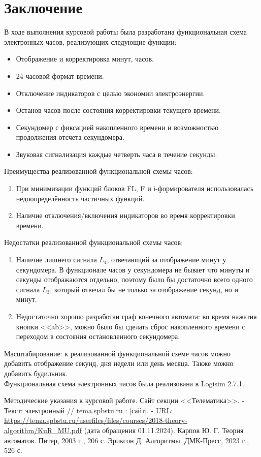 \documentclass[10pt,a4paper,final]{article} %
\begin{document}
\section*{Заключение}
В ходе выполнения курсовой работы была разработана функциональная схема электронных часов, реализующих следующие функции:
\begin{itemize}
	\item Отображение и корректировка минут, часов.
	\item 24-часовой формат времени.
	\item Отключение индикаторов с целью экономии электроэнергии.
	\item Останов часов после состояния корректировки текущего времени.
	\item Секундомер с фиксацией накопленного времени и возможностью продолжения отсчета секундомера.
	\item Звуковая сигнализация каждые четверть часа в течение секунды.
\end{itemize}
Преимущества реализованной функциональной схемы часов:
\begin{enumerate}
	\item При минимизации функций блоков FL, F и i-формирователя использовалась недоопределённость частичных функций.
	\item Наличие отключения/включения индикаторов во время корректировки времени.
\end{enumerate}
Недостатки реализованной функциональной схемы часов:
\begin{enumerate}
	\item Наличие лишнего сигнала $L_4$, отвечающий за отображение минут у секундомера. В функционале часов у секундомера не бывает что минуты и секунды отображаются отдельно, поэтому было бы достаточно всего одного сигнала $L_3$, который отвечал бы не только за отображение секунд, но и минут.
	\item Недостаточно хорошо разработан граф конечного автомата: во время нажатия кнопки <<ab>>, можно было бы сделать сброс накопленного времени с переходом в состояния остановленного секундомера.
\end{enumerate}
Масштабирование: к реализованной функциональной схеме часов можно добавить отображение секунд, дня недели или день месяца. Также можно добавить будильник.\\

\noindent Функциональная схема электронных часов была реализована в Logisim 2.7.1. 

\newpage
{}

\begin{thebibliography}{0}
	 Методические указания к курсовой работе. Сайт секции <<Телематика>>. - Текст: электронный // tema.spbstu.ru : [сайт]. - URL: \href{https://tema.spbstu.ru/userfiles/files/courses/2018-theory-algorithm/KuR\_MU.pdf}{https://tema.spbstu.ru/userfiles/files/courses/2018-theory-algorithm/KuR\_MU.pdf} (дата обращения 01.11.2024).
	  Карпов Ю. Г. Теория автоматов. Питер, 2003 г., 206 с.
	 Эриксон Д. Алгоритмы. ДМК-Пресс, 2023 г., 526 с.
\end{thebibliography}
\end{document}
